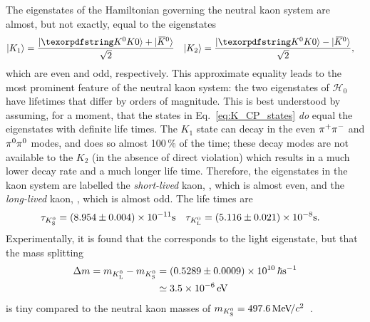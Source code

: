 The eigenstates of the Hamiltonian governing the neutral kaon system are almost, but not exactly, equal to the \CP eigenstates
\begin{align}\label{eq:K_CP_states}
    \ket{K_1}   &= \frac{\ket \Kz + \ket \Kzb}{\sqrt{2}} &
    \ket{K_2}   &= \frac{\ket \Kz - \ket \Kzb}{\sqrt{2}},
\end{align}
which are \CP even and odd, respectively. This approximate equality leads to the most prominent feature of the neutral kaon system: the two eigenstates of $\mathcal H_0$ have lifetimes that differ by orders of magnitude. This is best understood by assuming, for a moment, that the states in Eq.~\eqref{eq:K_CP_states} \emph{do} equal the eigenstates with definite life times. The $K_1$ state can decay in the \CP even ${{\pi}^+}{{\pi}^-}$ and ${{\pi}^0}{{\pi}^0}$ modes, and does so almost 100\,\% of the time; these decay modes are not available to the $K_2$ (in the absence of direct \CP violation) which results in a much lower decay rate and a much longer life time. Therefore, the eigenstates in the kaon system are labelled the \emph{short-lived} kaon, \KS, which is almost \CP even, and the \emph{long-lived} kaon, \KL, which is almost \CP odd. The life times are~\cite{PDG2020}
\begin{align}
    \tau_{{K}^0_{\mathrm{S}}} &= (8.954\pm0.004)\times10^{-11} \text s &
    \tau_{{K}^0_{\mathrm{L}}} &= (5.116\pm0.021)\times10^{-8} \text s.
\end{align}
Experimentally, it is found that the \KS corresponds to the light eigenstate, but that the mass splitting~\cite{PDG2020}
\begin{align}
\begin{split}
    \Delta m = m_{{K}^0_{\mathrm{L}}}-m_{{K}^0_{\mathrm{S}}} &= (0.5289\pm0.0009)\times 10^{10} \,\hbar \text s^{-1}\\
    &\simeq 3.5\times 10^{-6} \text{\,e\kern -0.1em V}
\end{split}
\end{align}
is tiny compared to the neutral kaon masses of $m_{{K}^0_{\mathrm{S}}}=497.6\text{\,Me\kern -0.1em V\!/}c^2$~\cite{PDG2020}.

